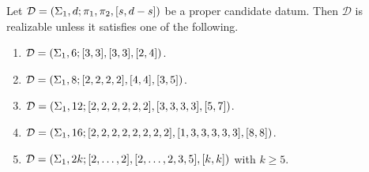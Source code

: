 \documentclass{article}
\begin{document}
\begin{theorem}\label{th:exceptional-n3-g1}
Let $\mathcal{D}=\left(\Sigma_1,d;\pi_1,\pi_2,[s,d-s]\right)$ be a proper candidate datum. Then $\mathcal{D}$ is realizable unless it satisfies one of the following.
\begin{enumerate}
\item $\mathcal{D}=\left(\Sigma_1,6;[3,3],[3,3],[2,4]\right)$.
\item $\mathcal{D}=\left(\Sigma_1,8;[2,2,2,2],[4,4],[3,5]\right)$.
\item $\mathcal{D}=\left(\Sigma_1,12;[2,2,2,2,2,2],[3,3,3,3],[5,7]\right)$.
\item $\mathcal{D}=\left(\Sigma_1,16;[2,2,2,2,2,2,2,2],[1,3,3,3,3,3],[8,8]\right)$.
\item $\mathcal{D}=\left(\Sigma_1,2k;[2,\ldots,2],[2,\ldots,2,3,5],[k,k]\right)$ with $k\ge 5$.
\end{enumerate}
\end{theorem}
\end{document}
